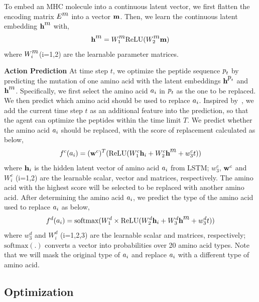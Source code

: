 \documentclass[letterpaper]{article}
\begin{document}
To embed an MHC molecule into a continuous latent vector, we first flatten the encoding matrix $E^{\mbox{$\mathop{m}$}}$ into a vector $\mbox{$\mathbf{m}$}$.
%
Then, we learn the continuous latent embedding $\mbox{$\mathbf{h}$}^{\mbox{$\mathop{m}$}}$ with,
%
\begin{equation}
\mbox{$\mathbf{h}$}^{\mbox{$\mathop{m}$}} = W_1^{\mbox{$\mathop{m}$}}\text{ReLU}(W_2^{\mbox{$\mathop{m}$}}\mbox{$\mathbf{m}$})
\end{equation}
%
where $W_i^{\mbox{$\mathop{m}$}}$(i=1,2) are the learnable parameter matrices.
%

\textbf{Action Prediction}
%
At time step $t$, we optimize the peptide sequence $\mbox{$\mathop{p}$}_{t}$ by predicting the mutation of one amino acid
with the latent embeddings $\mbox{$\mathbf{h}$}^{\mbox{$\mathop{p}$}_t}$ and $\mbox{$\mathbf{h}$}^{\mbox{$\mathop{m}$}}$.
%
Specifically, we first select the amino acid $\mbox{$\mathop{a}$}_i$ in $\mbox{$\mathop{p}$}_{t}$ as the one to be replaced.
%
We then predict which amino acid should be used to replace $\mbox{$\mathop{a}$}_i$.
%
Inspired by~\cite{pardo2018}, we add the current time step $t$ as an additional feature into the prediction,
so that the agent can optimize the peptides within the time limit $T$.
%
We predict whether the amino acid $\mbox{$\mathop{a}$}_i$ should be replaced, with the score of replacement calculated as below, 
\begin{equation}
f^c(\mbox{$\mathop{a}$}_i) = (\mathbf{w}^c)^T(\text{ReLU}(W_1^c\mbox{$\mathbf{h}$}_i + W_2^c\mbox{$\mathbf{h}$}^{\mbox{$\mathop{m}$}} + w_3^ct))
\end{equation}
%
where $\mbox{$\mathbf{h}$}_i$ is the hidden latent vector of amino acid $\mbox{$\mathop{a}$}_i$ from LSTM;
%
$w_3^c$, $\mathbf{w}^c$ and $W_i^c$ (i=1,2) are the learnable scalar, vector and matrices, respectively.
%
The amino acid with the highest score will be selected to be replaced with another amino acid.
%
After determining the amino acid $\mbox{$\mathop{a}$}_i$, we predict the type of the amino acid used to replace $\mbox{$\mathop{a}$}_i$ as below,
\begin{equation}
f^d(\mbox{$\mathop{a}$}_i) = \text{softmax}(W_1^d \times \text{ReLU}(W_2^d\mbox{$\mathbf{h}$}_i+W_3^d\mbox{$\mathbf{h}$}^{\mbox{$\mathop{m}$}}+w_3^dt))
\end{equation}  
where $w_3^d$ and $W_i^d$ (i=1,2,3) are the learnable scalar and matrices, respectively;
$\text{softmax}(.)$ converts a vector into probabilities over 20 amino acid types.
%
Note that we will mask the original type of $\mbox{$\mathop{a}$}_i$ and replace $\mbox{$\mathop{a}$}_i$ with a different type of amino acid.

\subsection{Optimization}
\label{sec:method:optimization}
\end{document}
